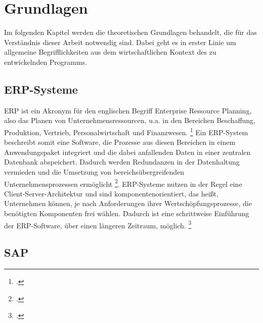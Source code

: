 \section{Grundlagen}
Im folgenden Kapitel werden die theoretischen Grundlagen behandelt, die für das Verständnis dieser Arbeit notwendig sind. Dabei geht es in erster Linie um allgemeine Begrifflichkeiten aus dem wirtschaftlichen Kontext des zu entwickelnden Programms.

\subsection{ERP-Systeme}
ERP ist ein Akronym für den englischen Begriff \glqq{}Enterprise Ressource Planning\grqq{}, also das Planen von Unternehmensressourcen, u.a. in den Bereichen Beschaffung, Produktion, Vertrieb, Personalwirtschaft und Finanzwesen. \footcite[Vgl.][523]{wibuch} Ein ERP-System beschreibt somit eine Software, die Prozesse aus diesen Bereichen in einem Anwendungspaket integriert und die dabei anfallenden Daten in einer zentralen Datenbank abspeichert. Dadurch werden Redundanzen in der Datenhaltung vermieden und die Umsetzung von bereichsübergreifenden Unternehmensprozessen ermöglicht \footcite[Vgl.][523]{wibuch}. ERP-Systeme nutzen in der Regel eine Client-Server-Architektur und sind komponentenorientiert, das heißt, Unternehmen können, je nach Anforderungen ihrer Wertschöpfungsprozesse, die benötigten Komponenten frei wählen. Dadurch ist eine schrittweise Einführung der ERP-Software, über einen längeren Zeitraum, möglich. \footcite[Vgl.][524 f.]{wibuch}

\subsection{SAP}
